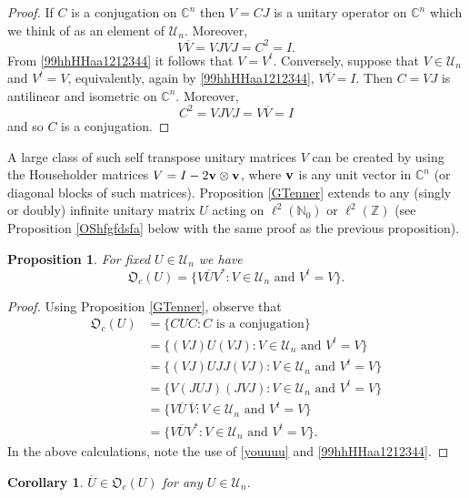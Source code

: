 \documentclass{dis}
\theoremstyle{plain}
\newtheorem{Proposition}[equation]{Proposition}
\newtheorem{Corollary}[equation]{Corollary}
\theoremstyle{definition}
\def\C{\mathbb{C}}
\def\N{\mathbb{N}}
\def\Z{\mathbb{Z}}
\renewcommand{\vec}[1]{{\bf #1}}
\newcommand{\0}{{\color{lightgray}0}}
\begin{document}
 \begin{proof}
 If $C$ is a conjugation on $\C^n$ then $V = C J$ is a unitary operator on $\C^n$ which we think of as an element of $\mathscr{U}_n$. Moreover, 
 $$V \overline{V} = V JVJ = C^2 = I.$$ From \eqref{99hhHHaa1212344} it follows that $V = V^{t}$. Conversely, suppose that $V \in \mathscr{U}_n$ and $V^{t} = V$, equivalently, again by \eqref{99hhHHaa1212344}, $V \overline{V} = I$. Then $C = V J$ is antilinear and isometric on $\C^n$. Moreover, 
 $$C^2 = V J VJ = V \overline{V} = I$$ and so $C$ is a conjugation.
 \end{proof}
 
  A large class of such self transpose unitary matrices $V$ can be created by using the Householder matrices $V = I - 2 \vec{v} \otimes \vec{v}$, where $\vec{v}$ is any unit vector in $\C^n$ (or diagonal blocks of such matrices). 
Proposition \ref{GTenner} extends to any (singly or doubly) infinite  unitary matrix $U$ acting on $\ell^2(\N_{0})$ or $\ell^2(\Z)$ (see Proposition \ref{OShfgfdsfa} below with the same proof as the previous proposition).

\begin{Proposition}\label{dfgdfgkkKKK12}
For fixed $U \in \mathscr{U}_n$ we have
 $$\mathfrak{O}_c(U) = \{V \overline{U} V^{*}: \mbox{$V \in \mathscr{U}_n$ and $V^{t} = V$}\}.$$
\end{Proposition}

\begin{proof}
Using Proposition \ref{GTenner}, observe that 
\begin{align*}
\mathfrak{O}_c(U) & = \{C U C: \mbox{$C$ is a conjugation}\}\\
& = \{(VJ) U (VJ): \mbox{$V \in \mathscr{U}_n$  and $V^{t} = V$}\}\\
& =  \{(VJ) U J J (VJ): \mbox{$V \in \mathscr{U}_n$  and $V^{t} = V$}\}\\
& =  \{V(J U J) (J VJ): \mbox{$V \in \mathscr{U}_n$  and $V^{t} = V$}\}\\
& =  \{V \overline{U}\, \overline{V}: \mbox{$V \in \mathscr{U}_n$  and $V^{t} = V$}\}\\
& = \{V \overline{U} V^{*}: \mbox{$V \in \mathscr{U}_{n}$ and $V^{t} = V$}\}.
\end{align*}
In the above calculations, note the use of \eqref{youuuu} and \eqref{99hhHHaa1212344}. 
\end{proof}

\begin{Corollary}\label{Ubbarrraaaa}
$\overline{U} \in \mathfrak{O}_c(U)$
for any $U \in \mathscr{U}_n$.
\end{Corollary}
\end{document}
